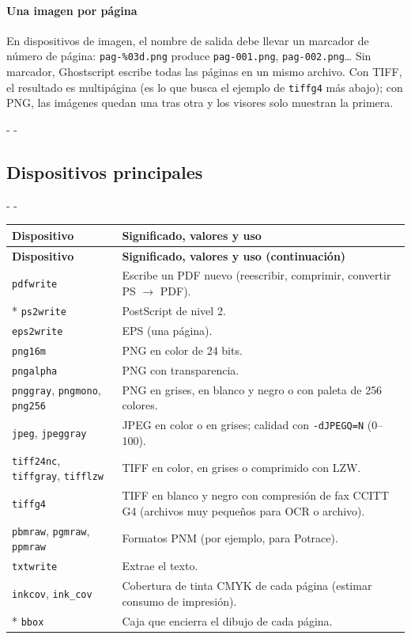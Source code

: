 \documentclass[11pt,a4paper]{article}
\makeatletter
\newcommand{\necesitaespacio}[1]{\par\penalty-100\begingroup
	\setlength{\dimen@}{#1}\dimen@ii\pagegoal\advance\dimen@ii-\pagetotal
	\ifdim\dimen@>\dimen@ii\ifdim\dimen@ii>\z@\vfil\fi\penalty-\@M\fi\endgroup}
\newenvironment{opciones}[1][Opción]{%
	\par\begingroup\small
	\begin{longtable}{L{4.25cm}L{11.2cm}}
		\toprule\rowcolor{tablacab}\cab{#1} & \cab{Significado, valores y uso} \\ \midrule
		\endfirsthead
		\toprule\rowcolor{tablacab}\cab{#1} & \cab{Significado, valores y uso (continuación)} \\ \midrule
		\endhead
		\bottomrule
		\endfoot}
	{\end{longtable}\endgroup}
\newcommand{\opt}[1]{\texttt{\textcolor{colopt}{#1}}}      %
\newcommand{\arch}[1]{\texttt{\textcolor{colarch}{#1}}}    %
\newcommand{\val}[1]{\texttt{#1}}                          %
\newcommand{\cab}[1]{\textbf{#1}}
\makeatother
\begin{document}
	\paragraph{Una imagen por página} En dispositivos de imagen, el nombre de salida debe llevar un marcador de número de página: \arch{pag-\%03d.png} produce \arch{pag-001.png}, \arch{pag-002.png}\ldots{} Sin marcador, Ghostscript escribe todas las páginas en un mismo archivo. Con TIFF, el resultado es multipágina (es lo que busca el ejemplo de \val{tiffg4} más abajo); con PNG, las imágenes quedan una tras otra y los visores solo muestran la primera.
	
	\necesitaespacio{34\baselineskip}
	\subsection{Dispositivos principales}
	
	\necesitaespacio{30\baselineskip}
	\begin{opciones}[Dispositivo]
		\val{pdfwrite} & Escribe un PDF nuevo (reescribir, comprimir, convertir PS $\rightarrow$ PDF).\\*
		\val{ps2write} & PostScript de nivel 2.\\
		\val{eps2write} & EPS (una página).\\
		\val{png16m} & PNG en color de 24 bits.\\
		\val{pngalpha} & PNG con transparencia.\\
		\val{pnggray}, \val{pngmono}, \val{png256} & PNG en grises, en blanco y negro o con paleta de 256 colores.\\
		\val{jpeg}, \val{jpeggray} & JPEG en color o en grises; calidad con \opt{-dJPEGQ=N} (0--100).\\
		\val{tiff24nc}, \val{tiffgray}, \val{tifflzw} & TIFF en color, en grises o comprimido con LZW.\\
		\val{tiffg4} & TIFF en blanco y negro con compresión de fax CCITT G4 (archivos muy pequeños para OCR o archivo).\\
		\val{pbmraw}, \val{pgmraw}, \val{ppmraw} & Formatos PNM (por ejemplo, para Potrace).\\
		\val{txtwrite} & Extrae el texto.\\
		\val{inkcov}, \val{ink\_cov} & Cobertura de tinta CMYK de cada página (estimar consumo de impresión).\\*
		\val{bbox} & Caja que encierra el dibujo de cada página.\\
	\end{opciones}
	
\end{document}
